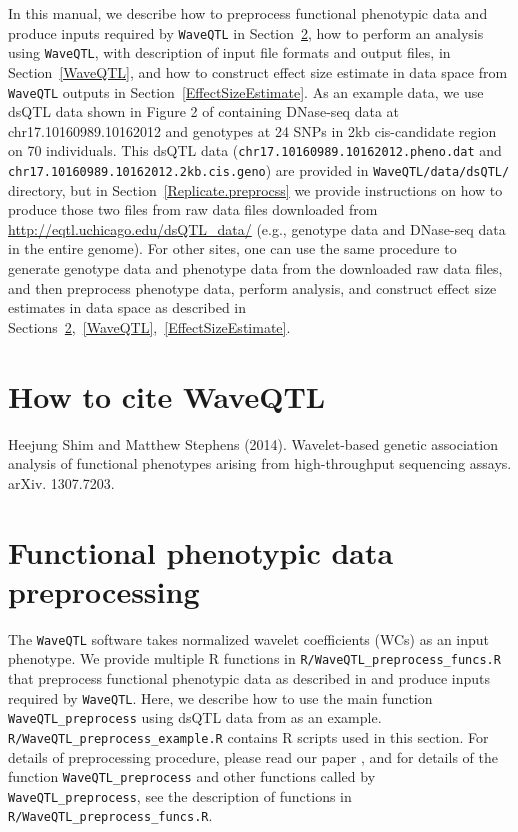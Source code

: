 \documentclass[11pt]{article}
\begin{document}
In this manual, we describe how to preprocess functional phenotypic data and produce inputs required by {\tt WaveQTL} in Section~\ref{preprocessing}, how to perform an analysis using {\tt WaveQTL}, with description of input file formats and output files, in Section~\ref{WaveQTL}, and how to construct effect size estimate in data space from {\tt WaveQTL} outputs in Section~\ref{EffectSizeEstimate}. As an example data, we use dsQTL data shown in Figure 2 of \cite{Shim2014} containing DNase-seq data at chr17.10160989.10162012 and genotypes at 24 SNPs in 2kb cis-candidate region on 70 individuals. This dsQTL data ({\tt chr17.10160989.10162012.pheno.dat} and {\tt chr17.10160989.10162012.2kb.cis.geno}) are provided in {\tt WaveQTL/data/dsQTL/} directory, but in Section~\ref{Replicate.preprocss} we provide instructions on how to produce those two files from raw data files downloaded from \url{http://eqtl.uchicago.edu/dsQTL_data/} (e.g., genotype data and DNase-seq data in the entire genome). For other sites, one can use the same procedure to generate genotype data and phenotype data from the downloaded raw data files, and then preprocess phenotype data, perform analysis, and construct effect size estimates in data space as described in Sections~\ref{preprocessing},~\ref{WaveQTL},~\ref{EffectSizeEstimate}.

\section{How to cite WaveQTL}
Heejung Shim and Matthew Stephens (2014). Wavelet-based genetic association analysis of functional phenotypes arising from high-throughput sequencing assays. arXiv. 1307.7203. 


\section{Functional phenotypic data preprocessing}\label{preprocessing} 
The {\tt WaveQTL} software takes normalized wavelet coefficients (WCs) as an input phenotype. We provide multiple R functions in {\tt R/WaveQTL\_preprocess\_funcs.R} that preprocess functional phenotypic data as described in \cite{Shim2014} and produce inputs required by {\tt WaveQTL}. Here, we describe how to use the main function {\tt WaveQTL\_preprocess} using dsQTL data from \cite{Shim2014} as an example. 
{\tt R/WaveQTL\_preprocess\_example.R} contains R scripts used in this section. For details of preprocessing procedure, please read our paper \cite{Shim2014}, and for details of the function {\tt WaveQTL\_preprocess} and other functions called by {\tt WaveQTL\_preprocess}, see the description of functions in {\tt R/WaveQTL\_preprocess\_funcs.R}. 
\end{document}
